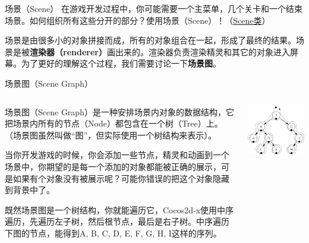 \documentclass{beamer}
\newcommand{\hrefcol}[2]{\textcolor{cyan}{\href{#1}{#2}}}
\begin{document}

\begin{frame}[fragile]{场景（Scene）}
在游戏开发过程中，你可能需要一个主菜单，几个关卡和一个结束场景。如何组织所有这些分开的部分？使用场景（Scene）！（\hrefcol{https://github.com/MinmusLin/Teamfight_Tactics/tree/main/src/Classes/Scene}{Scene类}）

\vspace{1em}

场景是由很多小的对象拼接而成，所有的对象组合在一起，形成了最终的结果。场景是被\textbf{渲染器（renderer）}画出来的。渲染器负责渲染精灵和其它的对象进入屏幕。为了更好的理解这个过程，我们需要讨论一下\textbf{场景图}。
\end{frame}


\begin{frame}[fragile]{场景图（Scene Graph）}
\begin{columns}
\begin{column}{0.65\textwidth}
场景图（Scene Graph）是一种安排场景内对象的数据结构，它把场景内所有的节点（Node）都包含在一个树（Tree）上。（场景图虽然叫做“图”，但实际使用一个树结构来表示）。

\vspace{1em}

当你开发游戏的时候，你会添加一些节点，精灵和动画到一个场景中，你期望的是每一个添加的对象都能被正确的展示，可是如果有个对象没有被展示呢？可能你错误的把这个对象隐藏到背景中了。

\vspace{1em}

既然场景图是一个树结构，你就能遍历它，Cocos2d-x使用中序遍历，先遍历左子树，然后根节点，最后是右子树。中序遍历下图的节点，能得到A, B, C, D, E, F, G, H, I这样的序列。
\end{column}
\begin{column}{0.35\textwidth}
\includegraphics[width=\textwidth]
{figures/scene_graph}
\end{column}
\end{columns}
\end{frame}
\end{document}
